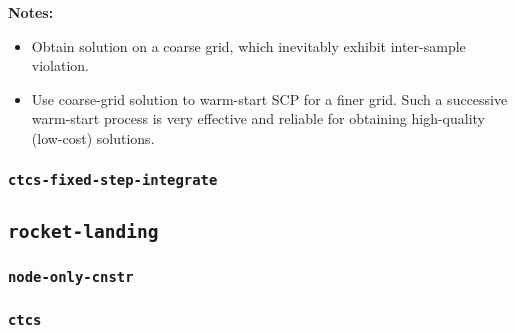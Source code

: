 \documentclass[11pt,a4paper]{article}
\begin{document}
\textbf{Notes:}
\begin{itemize}
    \item Obtain solution on a coarse grid, which inevitably exhibit inter-sample violation.
    \item Use coarse-grid solution to warm-start SCP for a finer grid. Such a successive warm-start process is very effective and reliable for obtaining high-quality (low-cost) solutions.
\end{itemize}

\subsubsection{\texttt{ctcs-fixed-step-integrate}}

\subsection{\texttt{rocket-landing}}

\subsubsection{\texttt{node-only-cnstr}}

\subsubsection{\texttt{ctcs}}
\end{document}
